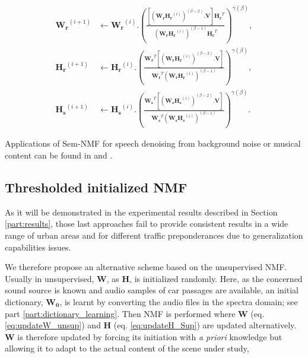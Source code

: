 \documentclass[twocolumn]{svjour3}          %
\begin{document}
{\scriptsize
\begin{subequations}\label{eq:WH-SSupdate}
\begin{align}
\mathbf{W_r}^{(i+1)} &\leftarrow \mathbf{W_r}^{(i)}.\left(\frac{\left[\left(\mathbf{W_r H_r}^{(i)} \right)^{(\beta-2)}.\mathbf{V} \right]\mathbf{H_r}^T}{\left(\mathbf{W_r H_r}^{(i)} \right)^{(\beta-1)}\mathbf{H_r}^T}\right)^{\gamma(\beta)}, \label{eq:W_r_SS}\\
\mathbf{H_r}^{(i+1)} &\leftarrow \mathbf{H_r}^{(i)}.\left(\frac{\mathbf{W_r}^T \left[\left(\mathbf{W_r H_r}^{(i)} \right)^{(\beta-2)}.\mathbf{V} \right]}{\mathbf{W_r}^T \left(\mathbf{W_r H_r}^{(i)} \right)^{(\beta-1)}}\right)^{\gamma(\beta)}, \label{eq:H_r_SS}\\
\mathbf{H_s}^{(i+1)} &\leftarrow \mathbf{H_s}^{(i)}.\left(\frac{\mathbf{W_s}^T \left[\left(\mathbf{W_s H_s}^{(i)} \right)^{(\beta-2)}.\mathbf{V} \right]}{\mathbf{W_s}^T \left(\mathbf{W_s H_s}^{(i)} \right)^{(\beta-1)}}\right)^{\gamma(\beta)}.\label{eq:H_s_SS}
\end{align}
\end{subequations}}

Applications of Sem-NMF for speech denoising from background noise or musical content can be found in \cite{joder2012real} and \cite{weninger2012supervised}.

\subsection{Thresholded initialized NMF}

As it will be demonstrated in the experimental results described in Section \ref{part:results}, those last approaches fail to provide consistent results in a wide range of urban areas and for different traffic preponderances due to generalization capabilities issues.

We therefore propose an alternative scheme based on the unsupervised NMF. Usually in unsupervised, $\mathbf{W}$, as  $\mathbf{H}$, is initialized randomly. Here, as the concerned sound source is known and audio samples of car passages are available, an initial dictionary, $\mathbf{W_0}$, is learnt by converting the audio files in the spectra domain; see part \ref{part:dictionary_learning}. Then NMF is performed where $\mathbf{W}$ (eq. \ref{eq:updateW_unsup}) and $\mathbf{H}$ (eq.  \ref{eq:updateH_Sup}) are updated alternatively. $\mathbf{W}$ is therefore updated by forcing its initiation with \textit{a priori} knowledge but allowing it to adapt to the actual content of the scene under study,
\end{document}
